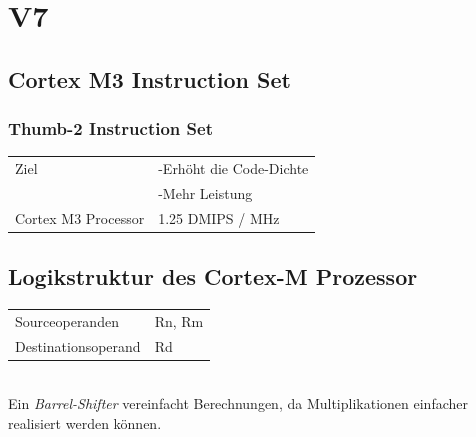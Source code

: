 \section{V7}
\subsection{Cortex M3 Instruction Set}
\begin{multicols}{2}  
\subsubsection{Thumb-2 Instruction Set}
\begin{tabular}{l l}
    Ziel&-Erhöht die Code-Dichte\\
        &  -Mehr Leistung\\ 
  Cortex M3 Processor  & 1.25 DMIPS / MHz\\ 
\end{tabular} 

\begin{minipage}{\textwidth}
\subsection{Logikstruktur des Cortex-M Prozessor}
\begin{tabular}{ll} 
    Sourceoperanden& Rn, Rm \\ 
    Destinationsoperand& Rd  \\ 
\end{tabular} \\
Ein \textit{Barrel-Shifter} vereinfacht Berechnungen,\newline
da Multiplikationen einfacher realisiert werden können.
\end{minipage}
\end{multicols}

